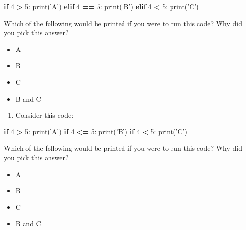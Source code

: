 \documentclass[]{book}
\newenvironment{Shaded}{\begin{snugshade}}{\end{snugshade}}
\newcommand{\BuiltInTok}[1]{#1}
\newcommand{\ControlFlowTok}[1]{\textcolor[rgb]{0.13,0.29,0.53}{\textbf{#1}}}
\newcommand{\DecValTok}[1]{\textcolor[rgb]{0.00,0.00,0.81}{#1}}
\newcommand{\NormalTok}[1]{#1}
\newcommand{\OperatorTok}[1]{\textcolor[rgb]{0.81,0.36,0.00}{\textbf{#1}}}
\newcommand{\StringTok}[1]{\textcolor[rgb]{0.31,0.60,0.02}{#1}}
\providecommand{\tightlist}{%
  \setlength{\itemsep}{0pt}\setlength{\parskip}{0pt}}
\theoremstyle{definition}
\theoremstyle{definition}
\theoremstyle{definition}
\theoremstyle{remark}
\begin{document}
\begin{Shaded}
\begin{Highlighting}[]
\ControlFlowTok{if} \DecValTok{4} \OperatorTok{>} \DecValTok{5}\NormalTok{:}
    \BuiltInTok{print}\NormalTok{(}\StringTok{'A'}\NormalTok{)}
\ControlFlowTok{elif} \DecValTok{4} \OperatorTok{==} \DecValTok{5}\NormalTok{:}
    \BuiltInTok{print}\NormalTok{(}\StringTok{'B'}\NormalTok{)}
\ControlFlowTok{elif} \DecValTok{4} \OperatorTok{<} \DecValTok{5}\NormalTok{:}
    \BuiltInTok{print}\NormalTok{(}\StringTok{'C'}\NormalTok{)}
\end{Highlighting}
\end{Shaded}

Which of the following would be printed if you were to run this code?
Why did you pick this answer?

\begin{itemize}
\tightlist
\item
  A
\item
  B
\item
  C
\item
  B and C
\end{itemize}

\begin{enumerate}
\def\labelenumi{\arabic{enumi}.}
\setcounter{enumi}{1}
\tightlist
\item
  Consider this code:
\end{enumerate}

\begin{Shaded}
\begin{Highlighting}[]
\ControlFlowTok{if} \DecValTok{4} \OperatorTok{>} \DecValTok{5}\NormalTok{:}
    \BuiltInTok{print}\NormalTok{(}\StringTok{'A'}\NormalTok{)}
\ControlFlowTok{if} \DecValTok{4} \OperatorTok{<=} \DecValTok{5}\NormalTok{:}
    \BuiltInTok{print}\NormalTok{(}\StringTok{'B'}\NormalTok{)}
\ControlFlowTok{if} \DecValTok{4} \OperatorTok{<} \DecValTok{5}\NormalTok{:}
    \BuiltInTok{print}\NormalTok{(}\StringTok{'C'}\NormalTok{)}
\end{Highlighting}
\end{Shaded}

Which of the following would be printed if you were to run this code?
Why did you pick this answer?

\begin{itemize}
\tightlist
\item
  A
\item
  B
\item
  C
\item
  B and C
\end{itemize}
\end{document}
